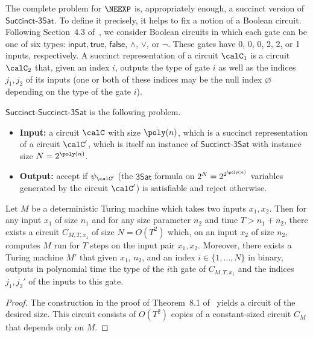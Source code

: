 \documentclass[11pt]{article}
\newcommand{\sat}{\mathsf{3Sat}}
\newcommand{\succinct}{\mathsf{Succinct}\text{-}\mathsf{3Sat}}
\newcommand{\succinctsquared}{\mathsf{Succinct}\text{-}\mathsf{Succinct}\text{-}\mathsf{3Sat}}
\begin{document}
The complete problem for $\NEEXP$ is, appropriately enough, a succinct
version of $\succinct$. To define it precisely, it helps to fix a
notion of a Boolean circuit. Following Section~4.3 of~\cite{Pap94}, we consider Boolean circuits in which each gate can
be one of six types: $\mathsf{input}, \mathsf{true}$, $\mathsf{false}$, $\wedge$,
$\vee$, or $\lnot$. These gates have 0, 0, 0, 2, 2, or 1 inputs,
respectively. A succinct representation of a circuit $\calC_1$ is a
circuit $\calC_2$ that, given an index $i$, outputs the type of gate
$i$ as well as the indices $j_1, j_2$ of its inputs (one or both of
these indices may be the null index $\varnothing$ depending on the
type of the gate $i$).
\begin{definition}
  $\succinctsquared$ is the following problem.
  \begin{itemize}
    \item[$\circ$] {\bf Input:} a circuit $\calC$ with size
      $\poly(n)$, which is a succinct representation of
      a circuit $\calC'$, which is itself an instance of $\succinct$
      with instance size $N = 2^{\poly(n)}$.
      \item[$\circ$] {\bf Output:} accept if $\psi_{\calC'}$ (the $\sat$
        formula on $2^N = 2^{2^{\poly(n)}}$ variables generated by the
        circuit $\calC'$) is
        satisfiable and reject otherwise.
      \end{itemize}
\end{definition}
\begin{fact}\label{fact:p-to-ppoly}
  Let $M$ be a deterministic Turing machine which takes two inputs $x_1, x_2$. Then
  for any input $x_1$ of size $n_1$ and for any size parameter $n_2$
  and time $T > n_1 + n_2$, there exists a
  circuit $C_{M,T,x_1}$ of size $N = O(T^2)$ which, on an input $x_2$ of
  size $n_2$, computes $M$ run for $T$
  steps on the input pair $x_1, x_2$. Moreover, there exists a Turing
  machine $M'$ that given $x_1$, $n_2$, and an
  index $i \in  \{1, \dots, N\}$ in binary, outputs in polynomial time
  the type of the $i$th gate of
  $C_{M,T, x_1}$ and the indices $j_1, j_2'$ of the inputs to this gate.
\end{fact}
\begin{proof}
  The construction in the proof of Theorem~8.1 of~\cite{Pap94} yields
  a circuit of the desired size. This circuit consists of $O(T^2)$
  copies of a constant-sized circuit $C_{M}$ that depends only on
  $M$. 
\end{proof}
\end{document}
